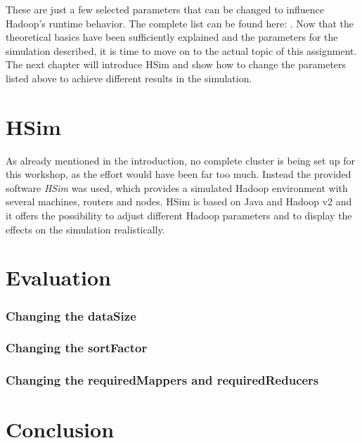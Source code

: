 These are just a few selected parameters that can be changed to influence Hadoop's runtime behavior. The complete list can be found here: \cite[see][]{AP03}. Now that the theoretical basics have been sufficiently explained and the parameters for the simulation described, it is time to move on to the actual topic of this assignment. The next chapter will introduce HSim and show how to change the parameters listed above to achieve different results in the simulation.
\chapter{HSim}
\label{hsim}
As already mentioned in the introduction, no complete cluster is being set up for this workshop, as the effort would have been far too much. Instead the provided software \textit{HSim} was used, which provides a simulated Hadoop environment with several machines, routers and nodes. HSim is based on Java and Hadoop v2 and it offers the possibility to adjust different Hadoop parameters and to display the effects on the simulation realistically.
\chapter{Evaluation}
\label{eval}
\subsection{Changing the dataSize}
\subsection{Changing the sortFactor}
\subsection{Changing the requiredMappers and requiredReducers}

\chapter{Conclusion}
\label{conlusion}


